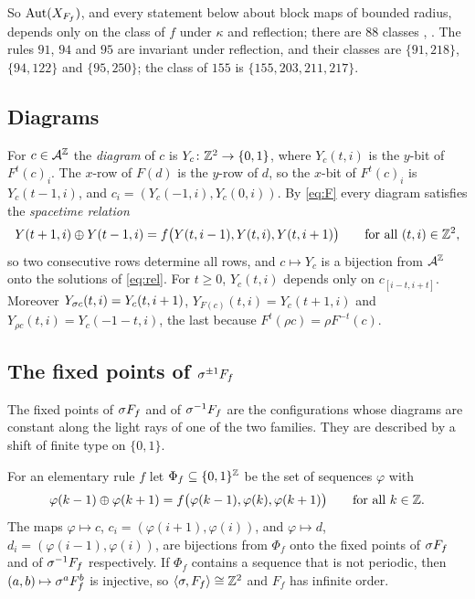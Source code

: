 So $\operatorname{Aut}(X_{F_f})$, and every statement below about block maps of bounded radius, depends only on the class of $f$ under $\kappa$ and reflection; there are $88$ classes \cite{Takesue1987}, \cite[Table~I]{Takesue1989}. The rules $91$, $94$ and $95$ are invariant under reflection, and their classes are $\{91,218\}$, $\{94,122\}$ and $\{95,250\}$; the class of $155$ is $\{155,203,211,217\}$.

\subsection{Diagrams}
For $c\in\mathcal{A}^{\mathbb{Z}}$ the \emph{diagram} of $c$ is $Y_c\colon\mathbb{Z}^2\to\{0,1\}$, where $Y_c(t,i)$ is the $y$-bit of $F^t(c)_i$. The $x$-row of $F(d)$ is the $y$-row of $d$, so the $x$-bit of $F^t(c)_i$ is $Y_c(t-1,i)$, and $c_i=(Y_c(-1,i),Y_c(0,i))$. By \eqref{eq:F} every diagram satisfies the \emph{spacetime relation}
\begin{equation}\label{eq:rel}
Y(t+1,i)\oplus Y(t-1,i)=f\bigl(Y(t,i-1),Y(t,i),Y(t,i+1)\bigr)\qquad\text{for all }(t,i)\in\mathbb{Z}^2,
\end{equation}
so two consecutive rows determine all rows, and $c\mapsto Y_c$ is a bijection from $\mathcal{A}^{\mathbb{Z}}$ onto the solutions of \eqref{eq:rel}. For $t\ge0$, $Y_c(t,i)$ depends only on $c_{[i-t,i+t]}$. Moreover $Y_{\sigma c}(t,i)=Y_c(t,i+1)$, $Y_{F(c)}(t,i)=Y_c(t+1,i)$ and $Y_{\rho c}(t,i)=Y_c(-1-t,i)$, the last because $F^t(\rho c)=\rho F^{-t}(c)$.

\subsection{The fixed points of \texorpdfstring{$\sigma^{\pm1}F_f$}{sigma F}}\label{sec:fixed}
The fixed points of $\sigma F_f$ and of $\sigma^{-1}F_f$ are the configurations whose diagrams are constant along the light rays of one of the two families. They are described by a shift of finite type on $\{0,1\}$.

\begin{lemma}\label{cl:lem:Z2}
For an elementary rule $f$ let $\Phi_f\subseteq\{0,1\}^{\mathbb{Z}}$ be the set of sequences $\varphi$ with
\[
\varphi(k-1)\oplus\varphi(k+1)=f\bigl(\varphi(k-1),\varphi(k),\varphi(k+1)\bigr)\qquad\text{for all }k\in\mathbb{Z}.
\]
The maps $\varphi\mapsto c$, $c_i=(\varphi(i+1),\varphi(i))$, and $\varphi\mapsto d$, $d_i=(\varphi(i-1),\varphi(i))$, are bijections from $\Phi_f$ onto the fixed points of $\sigma F_f$ and of $\sigma^{-1}F_f$ respectively. If $\Phi_f$ contains a sequence that is not periodic, then $(a,b)\mapsto\sigma^aF_f^b$ is injective, so $\langle\sigma,F_f\rangle\cong\mathbb{Z}^2$ and $F_f$ has infinite order.
\end{lemma}


